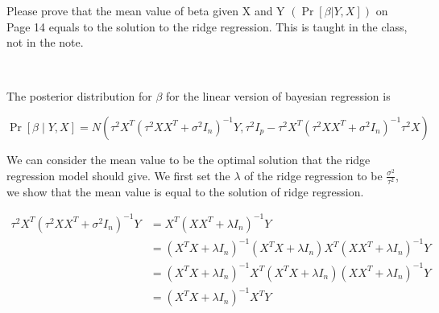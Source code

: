 \begin{exercise}[]{Please prove that the mean value of beta given X and Y $(\Pr[\beta | Y, X])$ on Page 14 equals to the solution to the ridge regression. This is taught in the class, not in the note.}
  \begin{solution}
  \par{~}

The posterior distribution for $\beta$ for the linear version of bayesian regression is

$$
\operatorname{Pr}[\beta \mid Y, X]=N\left(\tau^{2} X^{T}\left(\tau^{2} X X^{T}+\sigma^{2} I_{n}\right)^{-1} Y, \tau^{2} I_{p}-\tau^{2} X^{T}\left(\tau^{2} X X^{T}+\sigma^{2} I_{n}\right)^{-1} \tau^{2} X\right)
$$

We can consider the mean value to be the optimal solution that the ridge regression model should give. We first set the $\lambda$ of the ridge regression to be $\frac{\sigma^2}{\tau^2}$, we show that the mean value is equal to the solution of ridge regression.

\begin{equation}
    \begin{aligned}
    \tau^{2} X^{T}\left(\tau^{2} X X^{T}+\sigma^{2} I_{n}\right)^{-1} Y &= X^T(XX^T+\lambda I_n)^{-1} Y\\
    &=(X^TX+\lambda I_n)^{-1}(X^TX+\lambda I_n) X^T(XX^T+\lambda I_n)^{-1} Y \\
    &=(X^TX+\lambda I_n)^{-1}X^T(X^TX+\lambda I_n) (XX^T+\lambda I_n)^{-1} Y \\
    &=(X^TX+\lambda I_n)^{-1}X^T Y 
    \end{aligned}
\end{equation}

  \end{solution}
  \label{ex1}
\end{exercise}